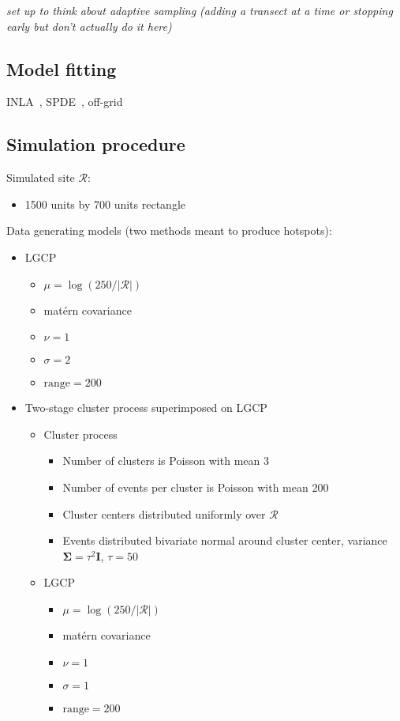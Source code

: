 \documentclass[review]{elsarticle}
\begin{document}
{\it set up to think about adaptive sampling (adding a transect at a time or
stopping early but don't actually do it here)}


\subsection{Model fitting}

INLA~\citep{rueetal}, SPDE~\citep{lindgrenetal}, off-grid~\citep{simpsonetal}


\subsection{Simulation procedure}

Simulated site \(\mathcal{R}\):
\begin{itemize}
\item 1500 units by 700 units rectangle
\end{itemize}

Data generating models (two methods meant to produce hotspots):
\begin{itemize}
\item LGCP
\begin{itemize}
\item \(\mu = \log(250 / |\mathcal{R}|)\)
\item mat\'{e}rn covariance
\item \(\nu = 1\)
\item \(\sigma = 2\)
\item \(\text{range} = 200\)
\end{itemize}
\item Two-stage cluster process superimposed on LGCP
\begin{itemize}
\item Cluster process
\begin{itemize}
\item Number of clusters is Poisson with mean 3
\item Number of events per cluster is Poisson with mean 200
\item Cluster centers distributed uniformly over \(\mathcal{R}\)
\item Events distributed bivariate normal around cluster center, variance
\(\boldsymbol{\Sigma} = \tau^{2}\mathbf{I}\), \(\tau = 50\)
\end{itemize}
\item LGCP
\begin{itemize}
\item \(\mu = \log(250 / |\mathcal{R}|)\)
\item mat\'{e}rn covariance
\item \(\nu = 1\)
\item \(\sigma = 1\)
\item \(\text{range} = 200\)
\end{itemize}
\end{itemize}
\end{itemize}
\end{document}
